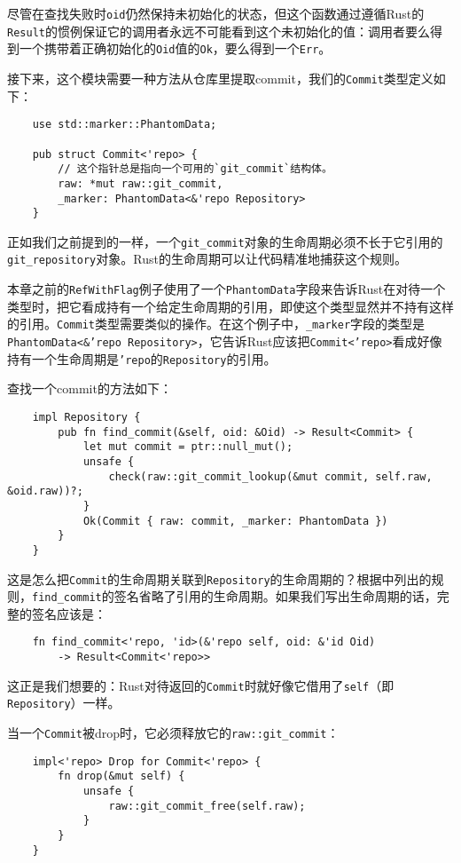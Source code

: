 尽管在查找失败时\texttt{oid}仍然保持未初始化的状态，但这个函数通过遵循Rust的\texttt{Result}的惯例保证它的调用者永远不可能看到这个未初始化的值：调用者要么得到一个携带着正确初始化的\texttt{Oid}值的\texttt{Ok}，要么得到一个\texttt{Err}。

接下来，这个模块需要一种方法从仓库里提取commit，我们的\texttt{Commit}类型定义如下：
\begin{verbatim}
    use std::marker::PhantomData;

    pub struct Commit<'repo> {
        // 这个指针总是指向一个可用的`git_commit`结构体。
        raw: *mut raw::git_commit,
        _marker: PhantomData<&'repo Repository>
    }
\end{verbatim}

正如我们之前提到的一样，一个\texttt{git\_commit}对象的生命周期必须不长于它引用的\texttt{git\_repository}对象。Rust的生命周期可以让代码精准地捕获这个规则。

本章之前的\texttt{RefWithFlag}例子使用了一个\texttt{PhantomData}字段来告诉Rust在对待一个类型时，把它看成持有一个给定生命周期的引用，即使这个类型显然并不持有这样的引用。\texttt{Commit}类型需要类似的操作。在这个例子中，\texttt{\_marker}字段的类型是\texttt{PhantomData<\&'repo Repository>}，它告诉Rust应该把\texttt{Commit<'repo>}看成好像持有一个生命周期是\texttt{'repo}的\texttt{Repository}的引用。

查找一个commit的方法如下：
\begin{verbatim}
    impl Repository {
        pub fn find_commit(&self, oid: &Oid) -> Result<Commit> {
            let mut commit = ptr::null_mut();
            unsafe {
                check(raw::git_commit_lookup(&mut commit, self.raw, &oid.raw))?;
            }
            Ok(Commit { raw: commit, _marker: PhantomData })
        }
    }
\end{verbatim}

这是怎么把\texttt{Commit}的生命周期关联到\texttt{Repository}的生命周期的？根据中列出的规则，\texttt{find\_commit}的签名省略了引用的生命周期。如果我们写出生命周期的话，完整的签名应该是：
\begin{verbatim}
    fn find_commit<'repo, 'id>(&'repo self, oid: &'id Oid)
        -> Result<Commit<'repo>>
\end{verbatim}

这正是我们想要的：Rust对待返回的\texttt{Commit}时就好像它借用了\texttt{self}（即\texttt{Repository}）一样。

当一个\texttt{Commit}被drop时，它必须释放它的\texttt{raw::git\_commit}：
\begin{verbatim}
    impl<'repo> Drop for Commit<'repo> {
        fn drop(&mut self) {
            unsafe {
                raw::git_commit_free(self.raw);
            }
        }
    }
\end{verbatim}


